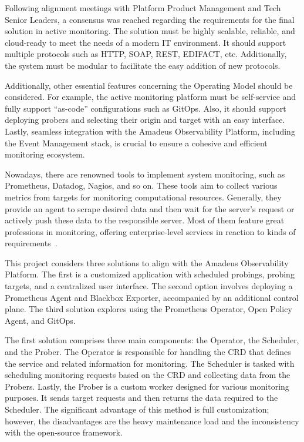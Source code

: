Following alignment meetings with Platform Product Management and Tech Senior Leaders, a consensus was reached regarding the requirements for the final solution in active monitoring. The solution must be highly scalable, reliable, and cloud-ready to meet the needs of a modern \ac{IT} environment. It should support multiple protocols such as \ac{HTTP}, \ac{SOAP}, \ac{REST}, \ac{EDIFACT}, etc. Additionally, the system must be modular to facilitate the easy addition of new protocols.

Additionally, other essential features concerning the Operating Model should be considered. For example, the active monitoring platform must be self-service and fully support “as-code” configurations such as GitOps. Also, it should support deploying probers and selecting their origin and target with an easy interface. Lastly, seamless integration with the Amadeus Observability Platform, including the Event Management stack, is crucial to ensure a cohesive and efficient monitoring ecosystem.

Nowadays, there are renowned tools to implement system monitoring, such as Prometheus, Datadog, Nagios, and so on. These tools aim to collect various metrics from targets for monitoring computational resources. Generally, they provide an agent to scrape desired data and then wait for the server's request or actively push these data to the responsible server. Most of them feature great professions in monitoring, offering enterprise-level services in reaction to kinds of requirements~\parencite{nevesDetailedBlackboxMonitoring2021}.

This project considers three solutions to align with the Amadeus Observability Platform. The first is a customized application with scheduled probings, probing targets, and a centralized user interface. The second option involves deploying a Prometheus Agent and Blackbox Exporter, accompanied by an additional control plane. The third solution explores using the Prometheus Operator, Open Policy Agent, and GitOps. 

The first solution comprises three main components: the Operator, the Scheduler, and the Prober. The Operator is responsible for handling the \ac{CRD} that defines the service and related information for monitoring. The Scheduler is tasked with scheduling monitoring requests based on the \ac{CRD} and collecting data from the Probers. Lastly, the Prober is a custom worker designed for various monitoring purposes. It sends target requests and then returns the data required to the Scheduler. The significant advantage of this method is full customization; however, the disadvantages are the heavy maintenance load and the inconsistency with the open-source framework. 

